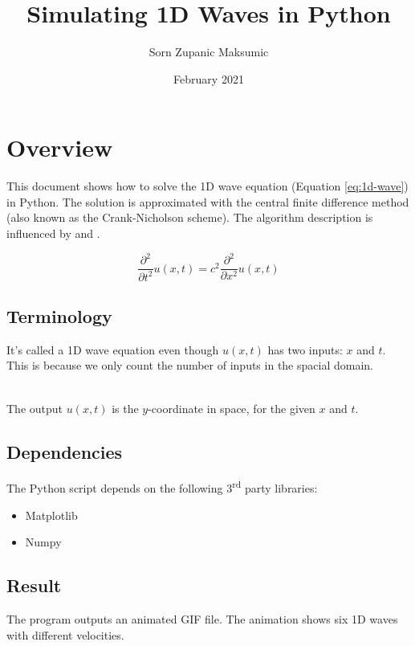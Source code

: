 \documentclass{article}
\title{Simulating 1D Waves in Python}
\author{Sorn Zupanic Maksumic}
\date{{\small February 2021}}
\begin{document}
\maketitle

\newpage
\tableofcontents

\newpage
\section{Overview}
This document shows how to solve the 1D wave equation (Equation \ref{eq:1d-wave}) in Python. The solution is approximated with the central finite difference method (also known as the Crank-Nicholson scheme). The algorithm description is influenced by \cite{hpl-decay} and \cite{hpl-wave}.

\begin{equation}
    \frac{\partial^2}{\partial t^2}u(x,t) = c^2\frac{\partial^2}{\partial x^2}u(x,t)
    \label{eq:1d-wave}
\end{equation}

\subsection{Terminology}
It's called a 1D wave equation even though $u(x,t)$ has two inputs: $x$ and $t$. This is because we only count the number of inputs in the spacial domain.

\noindent\\The output $u(x,t)$ is the $y$-coordinate in space, for the given $x$ and $t$.

\subsection{Dependencies}
The Python script depends on the following 3\textsuperscript{rd} party libraries:
\begin{itemize}
    \item Matplotlib
    \item Numpy
\end{itemize}

\subsection{Result}
The program outputs an animated GIF file. The animation shows six 1D waves with different velocities.


\end{document}
